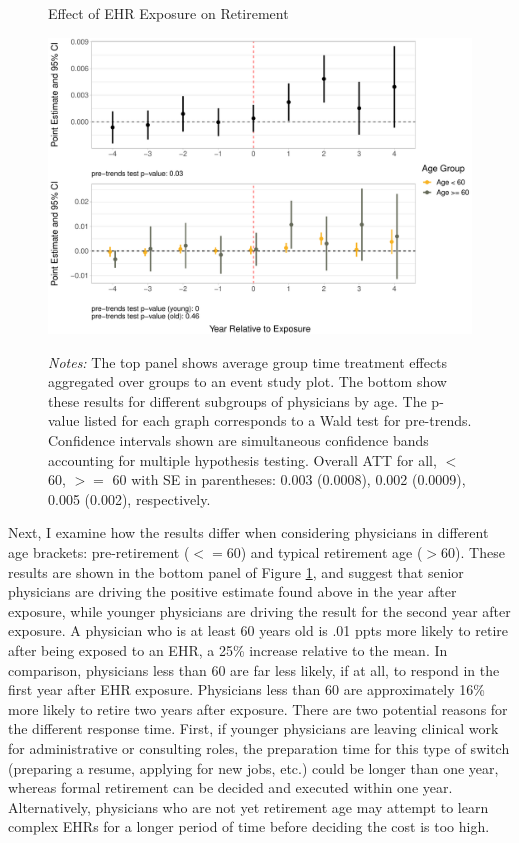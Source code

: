 \documentclass[12pt]{article}
\begin{document}
\begin{figure}[ht]
    \centering
    \captionsetup{width=.85\linewidth}
    \caption{Effect of EHR Exposure on Retirement}
    \includegraphics[scale=.6]{Objects/retire_plot.pdf}
    \label{fig:retirefirst}
    \vspace{2mm}
    \caption*{\footnotesize{\textit{Notes:} The top panel shows average group time treatment effects aggregated over groups to an event study plot. The bottom show these results for different subgroups of physicians by age. The p-value listed for each graph corresponds to a Wald test for pre-trends. Confidence intervals shown are simultaneous confidence bands accounting for multiple hypothesis testing. Overall ATT for all, $<$ 60, $>=$ 60 with SE in parentheses: 0.003 (0.0008), 0.002 (0.0009), 0.005 (0.002), respectively.}}
\end{figure}


Next, I examine how the results differ when considering physicians in different age brackets: pre-retirement ($<= 60$) and typical retirement age ($> 60$). These results are shown in the bottom panel of Figure \ref{fig:retirefirst}, and suggest that senior physicians are driving the positive estimate found above in the year after exposure, while younger physicians are driving the result for the second year after exposure. A physician who is at least 60 years old is .01 ppts more likely to retire after being exposed to an EHR, a 25\% increase relative to the mean. In comparison, physicians less than 60 are far less likely, if at all, to respond in the first year after EHR exposure. Physicians less than 60 are approximately 16\% more likely to retire two years after exposure. There are two potential reasons for the different response time. First, if younger physicians are leaving clinical work for administrative or consulting roles, the preparation time for this type of switch (preparing a resume, applying for new jobs, etc.) could be longer than one year, whereas formal retirement can be decided and executed within one year. Alternatively, physicians who are not yet retirement age may attempt to learn complex EHRs for a longer period of time before deciding the cost is too high. 
\end{document}

